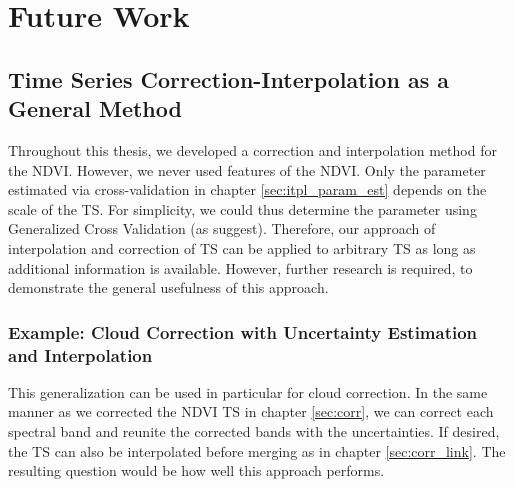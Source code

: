 \section{Future Work}{
    \label{sec:FutureWork}

    \subsection{Time Series Correction-Interpolation as a General Method}{
        Throughout this thesis, we developed a correction and interpolation method for the NDVI. However, we never used features of the NDVI. Only the parameter estimated via cross-validation in chapter \ref{sec:itpl_param_est} depends on the scale of the {TS}. For simplicity, we could thus determine the parameter using Generalized Cross Validation (as  suggest). Therefore, our approach of interpolation and correction of {TS} can be applied to arbitrary {TS} as long as additional information is available. However, further research is required, to demonstrate the general usefulness of this approach.


        \subsubsection*{Example: Cloud Correction with Uncertainty Estimation and Interpolation}
            This generalization can be used in particular for cloud correction. In the same manner as we corrected the NDVI {TS} in chapter \ref{sec:corr}, we can correct each spectral band and reunite the corrected bands with the uncertainties. If desired, the {TS} can also be interpolated before merging as in chapter \ref{sec:corr_link}. The resulting question would be how well this approach performs.
    }



}
